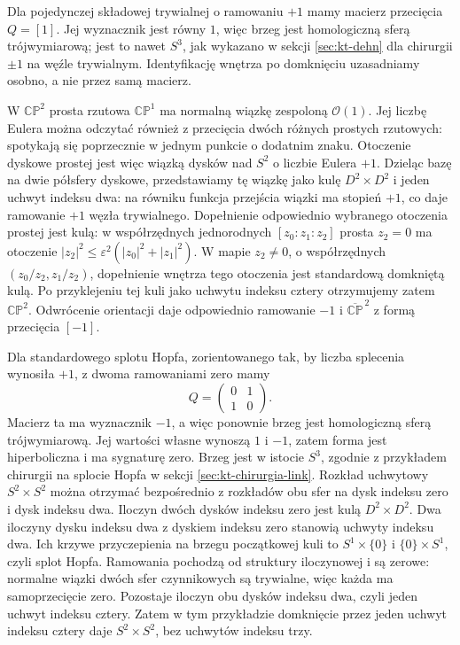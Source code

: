 \begin{przyklad}
Dla pojedynczej składowej trywialnej o ramowaniu $+1$
mamy macierz przecięcia $Q=[1]$. Jej wyznacznik jest równy $1$,
więc brzeg jest homologiczną sferą trójwymiarową;
jest to nawet $S^3$, jak wykazano w sekcji
\ref{sec:kt-dehn} dla chirurgii $\pm1$ na węźle
trywialnym. Identyfikację wnętrza po domknięciu
uzasadniamy osobno, a nie przez samą macierz.

W $\mathbb{CP}^2$ prosta rzutowa $\mathbb{CP}^1$
ma normalną wiązkę zespoloną $\mathcal O(1)$.
Jej liczbę Eulera można odczytać również
z przecięcia dwóch różnych prostych rzutowych:
spotykają się poprzecznie w jednym punkcie
o dodatnim znaku. Otoczenie dyskowe prostej
jest więc wiązką dysków nad $S^2$ o liczbie
Eulera $+1$. Dzieląc bazę na dwie półsfery
dyskowe, przedstawiamy tę wiązkę jako kulę
$D^2\times D^2$ i jeden uchwyt indeksu dwa:
na równiku funkcja przejścia wiązki ma stopień
$+1$, co daje ramowanie $+1$ węzła trywialnego.
Dopełnienie odpowiednio wybranego otoczenia
prostej jest kulą: w współrzędnych jednorodnych
$[z_0:z_1:z_2]$ prosta $z_2=0$ ma otoczenie
$|z_2|^2\le\varepsilon^2(|z_0|^2+|z_1|^2)$.
W mapie $z_2\ne0$, o współrzędnych
$(z_0/z_2,z_1/z_2)$, dopełnienie wnętrza
tego otoczenia jest standardową domkniętą kulą.
Po przyklejeniu tej kuli jako uchwytu indeksu
cztery otrzymujemy zatem $\mathbb{CP}^2$.
Odwrócenie orientacji daje odpowiednio
ramowanie $-1$ i $\overline{\mathbb{CP}}^{\,2}$
z formą przecięcia $[-1]$.

Dla standardowego splotu Hopfa, zorientowanego tak,
by liczba splecenia wynosiła $+1$, z dwoma ramowaniami zero mamy
\[
Q=\begin{pmatrix}0&1\\1&0\end{pmatrix}.
\]
Macierz ta ma wyznacznik $-1$, a więc ponownie brzeg jest
homologiczną sferą trójwymiarową. Jej wartości własne wynoszą
$1$ i $-1$, zatem forma jest hiperboliczna i ma sygnaturę zero.
Brzeg jest w istocie $S^3$, zgodnie z przykładem
chirurgii na splocie Hopfa w sekcji
\ref{sec:kt-chirurgia-link}.
Rozkład uchwytowy $S^2\times S^2$ można otrzymać
bezpośrednio z rozkładów obu sfer na dysk indeksu
zero i dysk indeksu dwa. Iloczyn dwóch dysków
indeksu zero jest kulą $D^2\times D^2$.
Dwa iloczyny dysku indeksu dwa z dyskiem indeksu
zero stanowią uchwyty indeksu dwa.
Ich krzywe przyczepienia na brzegu początkowej
kuli to $S^1\times\{0\}$ i $\{0\}\times S^1$,
czyli splot Hopfa. Ramowania pochodzą od
struktury iloczynowej i są zerowe: normalne
wiązki dwóch sfer czynnikowych są trywialne,
więc każda ma samoprzecięcie zero. Pozostaje
iloczyn obu dysków indeksu dwa, czyli jeden
uchwyt indeksu cztery. Zatem w tym przykładzie
domknięcie przez jeden uchwyt indeksu cztery
daje $S^2\times S^2$, bez uchwytów indeksu trzy.


\end{przyklad}
